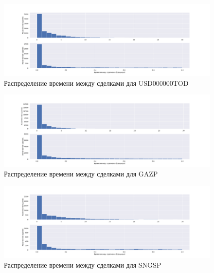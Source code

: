\begin{figure}
    \includegraphics[scale=0.35]{fig/timedistr/CU/USD000000TOD.pdf}
    \caption{Распределение времени между сделками для USD000000TOD}
    \label{TimeDistrUSD000000TOD}
\end{figure}

\begin{figure}
    \includegraphics[scale=0.35]{fig/timedistr/SE/GAZP.pdf}
    \caption{Распределение времени между сделками для GAZP}
    \label{TimeDistrGAZPWP}
\end{figure}

\begin{figure}
    \includegraphics[scale=0.35]{fig/timedistr/SE/SNGSP.pdf}
    \caption{Распределение времени между сделками для SNGSP}
    \label{TimeDistrSNGSPWP}
\end{figure}

